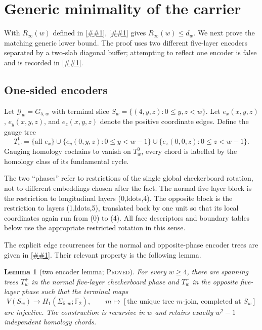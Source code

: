 \documentclass[11pt]{article}
\newcommand{\cref}[1]{\autoref{##1}}%
\newtheorem{lemma}[theorem]{Lemma}
\newcommand{\Ftwo}{\mathbb F_2}
\newcommand{\claimtag}[1]{\textsc{#1}}
\newcommand{\proved}{\claimtag{Proved}}
\begin{document}
\section{Generic minimality of the carrier}

With \(R_\infty(w)\) defined in \cref{eq:Rinf},
\cref{thm:grid-upper} gives \(R_\infty(w)\leq d_w\).  We next prove
the matching generic lower bound.
The proof uses two different five-layer
encoders separated by a two-slab diagonal buffer; attempting to reflect one
encoder is false and is recorded in \cref{sec:failure}.

\subsection{One-sided encoders}

Let \(\mathcal G_w=G_{5,w}\) with terminal slice
\(S_w=\{(4,y,z):0\leq y,z<w\}\).  Let \(e_x(x,y,z)\), \(e_y(x,y,z)\), and
\(e_z(x,y,z)\) denote the positive coordinate edges.  Define the gauge tree
\begin{equation}\label{eq:T0}
 T_w^0=\{\text{all }e_x\}
 \cup\{e_y(0,y,z):0\leq y<w-1\}
 \cup\{e_z(0,0,z):0\leq z<w-1\}.
\end{equation}
Gauging homology cochains to vanish on \(T_w^0\), every chord is labelled by
the homology class of its fundamental cycle.

The two ``phases'' refer to restrictions of the single global checkerboard
rotation, not to different embeddings chosen after the fact.  The normal
five-layer block is the restriction to longitudinal layers (0,ldots,4).
The opposite block is the restriction to layers (1,ldots,5), translated
back by one unit so that its local coordinates again run from (0) to (4).
All face descriptors and boundary tables below use the appropriate restricted
rotation in this sense.

The explicit edge recurrences for the normal and opposite-phase encoder
trees are given in \cref{app:encoders}.  Their relevant property is the
following lemma.

\begin{lemma}[two encoder lemma; \proved]\label{lem:encoders}
For every \(w\geq4\), there are spanning trees \(T_w^+\) in the normal
five-layer checkerboard phase and \(T_w^-\) in the opposite five-layer phase
such that the terminal maps
\begin{equation}\label{eq:terminal-map}
 V(S_w)\longrightarrow H_1(\Sigma_{5,w};\Ftwo),\qquad
 m\longmapsto[\text{the unique tree }m\text{-join, completed at }S_w]
\end{equation}
are injective.  The construction is recursive in \(w\) and retains exactly
\(w^2-1\) independent homology chords.
\end{lemma}
\end{document}
